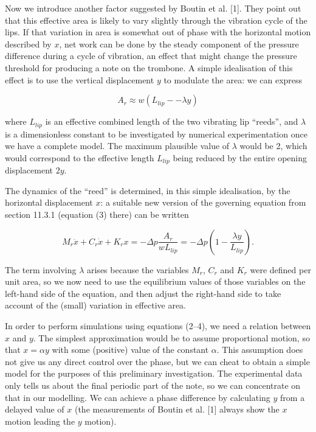   Now we introduce another factor suggested by Boutin et al. [1]. They point 
  out that this effective area is likely to vary slightly through the vibration 
  cycle of the lips. If that variation in area is somewhat out of phase with 
  the horizontal motion described by $x$, net work can be done by the steady 
  component of the pressure difference during a cycle of vibration, an effect 
  that might change the pressure threshold for producing a note on the 
  trombone. A simple idealisation of this effect is to use the vertical 
  displacement $y$ to modulate the area: we can express 

  \begin{equation*}A_r \approx w (L_{lip} -- \lambda y) \tag{3}\end{equation*} 

  \noindent{}where $L_{lip}$ is an effective combined length of the two 
  vibrating lip ``reeds'', and $\lambda$ is a dimensionless constant to be 
  investigated by numerical experimentation once we have a complete model. The 
  maximum plausible value of $\lambda$ would be 2, which would correspond to 
  the effective length $L_{lip}$ being reduced by the entire opening 
  displacement $2y$. 

  The dynamics of the ``reed'' is determined, in this simple idealisation, by 
  the horizontal displacement $x$: a suitable new version of the governing 
  equation from section 11.3.1 (equation (3) there) can be written 

  \begin{equation*}M_r \ddot{x} + C_r \dot{x} + K_r x=-\Delta p \dfrac{A_r}{w 
  L_{lip}}=-\Delta p \left(1-\dfrac{\lambda y}{L_{lip}}\right) . 
  \tag{4}\end{equation*} 

  The term involving $\lambda$ arises because the variables $M_r$, $C_r$ and 
  $K_r$ were defined per unit area, so we now need to use the equilibrium 
  values of those variables on the left-hand side of the equation, and then 
  adjust the right-hand side to take account of the (small) variation in 
  effective area. 

  In order to perform simulations using equations (2--4), we need a relation 
  between $x$ and $y$. The simplest approximation would be to assume 
  proportional motion, so that $x=\alpha y$ with some (positive) value of the 
  constant $\alpha$. This assumption does not give us any direct control over 
  the phase, but we can cheat to obtain a simple model for the purposes of this 
  preliminary investigation. The experimental data only tells us about the 
  final periodic part of the note, so we can concentrate on that in our 
  modelling. We can achieve a phase difference by calculating $y$ from a 
  delayed value of $x$ (the measurements of Boutin et al. [1] always show the 
  $x$ motion leading the $y$ motion). 


